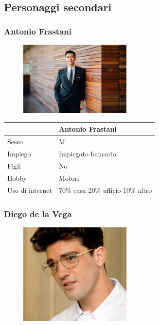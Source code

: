 \documentclass[12pt,italian,]{report}
\begin{document}
\newpage
\hypertarget{personaggi-secondari}{%
\subsection{Personaggi secondari}\label{personaggi-secondari}}

\hypertarget{antonio-frastani}{%
\subsubsection{Antonio Frastani}\label{antonio-frastani}}

\begin{figure}[h]
\centering
\includegraphics[width=0.5\textwidth,height=\textheight]{img/antonio.jpeg}
\end{figure}

\begin{longtable}[]{@{}ll@{}}
\toprule
& Antonio Frastani\tabularnewline
\midrule
\endhead
Sesso & M\tabularnewline
Impiego & Impiegato bancario\tabularnewline
Figli & No\tabularnewline
Hobby & Motori\tabularnewline
Uso di internet & 70\% casa 20\% ufficio 10\% altro\tabularnewline
\bottomrule
\end{longtable}


\newpage
\hypertarget{diego-de-la-vega}{%
\subsubsection{Diego de la Vega}\label{diego-de-la-vega}}

\begin{figure}[h]
\centering
\includegraphics[width=0.5\textwidth,height=\textheight]{img/diego.jpg}
\end{figure}
\end{document}
